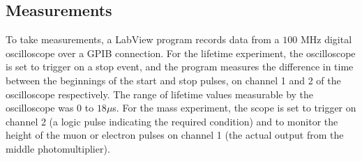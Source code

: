 \subsection{Measurements}
\label{measurements}
To take measurements, a LabView program records data from a $100$ MHz digital oscilloscope over a GPIB connection. For the lifetime experiment, the oscilloscope is set to trigger on a stop event, and the program measures the difference in time between the beginnings of the start and stop pulses, on channel 1 and 2 of the oscilloscope respectively. The range of lifetime values measurable by the oscilloscope was $0$ to $18 \mu$s. For the mass experiment, the scope is set to trigger on channel 2 (a logic pulse indicating the required condition) and to monitor the height of the muon or electron pulses on channel 1 (the actual output from the middle photomultiplier).